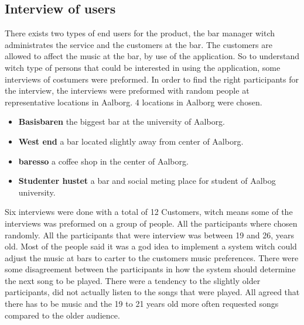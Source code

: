 \subsection{Interview of users}
\label{sub:interview_of_users}

There exists two types of end users for the product, the bar manager witch administrates the service and the customers at the bar. The customers are allowed to affect the music at the bar, by use of the application. So to understand witch type of persons that could be interested in using the application, some interviews of costumers were preformed. 
In order to find the right participants for the interview, the interviews were preformed with random people at representative locations in Aalborg. 4 locations in Aalborg were chosen. 

\begin{itemize}
	\item \textbf{Basisbaren} the biggest bar at the university of Aalborg. 
	\item \textbf{West end}	a bar located slightly away from center of Aalborg. 
	\item \textbf{baresso} a coffee shop in the center of Aalborg.
	\item \textbf{Studenter hustet} a bar and social meting place for student of  Aalbog university.
\end{itemize}
Six interviews were done with a total of 12 Customers, witch means some of the interviews was preformed on a group of people. All the participants where chosen randomly. 
All the participants that were interview was between 19 and 26, years old. Most of the people said it was a god idea to implement a system witch could adjust the music at bars to carter to the customers music preferences. There were some disagreement between the participants in how the system should determine the next song to be played. There were a tendency to the slightly older participants, did not actually listen to the songs that were played. All agreed that there has to be music and the 19 to 21 years old more often requested songs compared to the older audience. 

